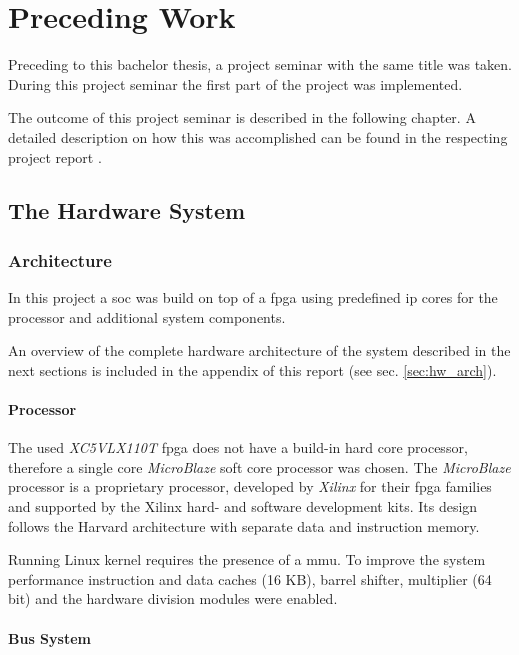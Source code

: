 \chapter{Preceding Work}
\label{cha:preceding}

Preceding to this bachelor thesis, a project seminar with the same title was taken. During this project seminar the first part of the project was implemented.

The outcome of this project seminar is described in the following chapter. A detailed description on how this was accomplished can be found in the respecting project report \cite{projectseminar}.

\section{The Hardware System}

\subsection{Architecture}

In this project a \gls{soc} was build on top of a \gls{fpga} using predefined \gls{ip} cores for the processor and additional system components.

An overview of the complete hardware architecture of the system described in the next sections is included in the appendix of this report (see sec. \ref{sec:hw_arch}).

\subsubsection{Processor}
\label{subsubsec:microblaze}

The used \textit{XC5VLX110T} \gls{fpga} does not have a build-in hard core processor, therefore a single core \textit{MicroBlaze} soft core processor was chosen. The \textit{MicroBlaze} processor is a proprietary processor, developed by \textit{Xilinx} for their \gls{fpga} families and supported by the Xilinx hard- and software development kits. Its design follows the Harvard architecture with separate data and instruction memory.

Running Linux kernel requires the presence of a \gls{mmu}. To improve the system performance instruction and data caches (16 KB), barrel shifter, multiplier (64 bit) and the hardware division modules were enabled.

\subsubsection{Bus System}

